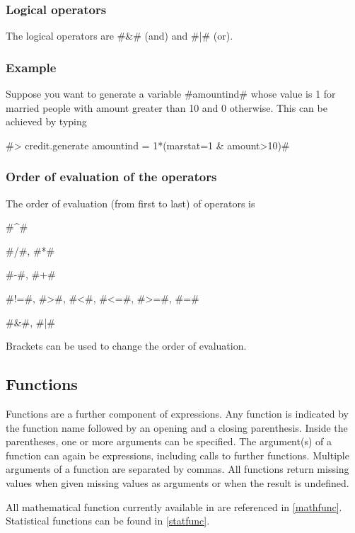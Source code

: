 \subsubsection{Logical operators}

The logical operators are #&# (and) and #|# (or).

\subsubsection*{Example}

Suppose you want to generate a variable #amountind# whose value is 1 for married people with amount greater than 10 and 0 otherwise. This can be achieved by typing

#> credit.generate amountind = 1*(marstat=1 & amount>10)#


\subsubsection{Order of evaluation of the operators}

The order of evaluation (from first to last) of operators is

 #^# 
 
 #/#, #*#
 
 #-#, #+#
 
 #!=#, #>#, #<#, #<=#, #>=#, #=#
 
 #&#, #|#

Brackets can be used to change the order of evaluation.


\subsection{Functions}

Functions are a further component of expressions. Any function is indicated by the function name followed by an opening and a closing parenthesis. Inside the parentheses, one or more arguments can be specified. The argument(s) of a function can again be expressions, including calls to further functions. Multiple arguments of a function are separated by commas. All functions return missing values when given missing values as arguments or when the result is undefined.

All mathematical function currently available in \BayesX are referenced in \autoref{mathfunc}. Statistical functions can be
found in \autoref{statfunc}.


